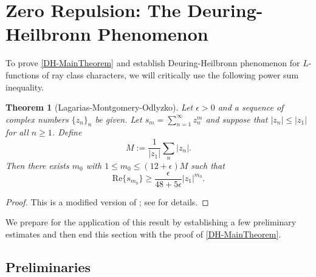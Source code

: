 \documentclass[12pt,psamsfonts]{amsart}
\newtheorem{thm}{Theorem}[section]
\theoremstyle{definition}
\theoremstyle{remark}
\numberwithin{equation}{section}
\theoremstyle{plain}
\theoremstyle{remark}
\renewcommand{\1}{ {\bf 1}}
\renewcommand{\Re}{\mathrm{Re}}
\begin{document}
\section{Zero Repulsion: The Deuring-Heilbronn Phenomenon}
\label{sec:DH_proof}

To prove \cref{DH-MainTheorem} and establish Deuring-Heilbronn phenomenon for $L$-functions of ray class characters, we will critically use the following power sum inequality. 

\begin{thm}[Lagarias-Montgomery-Odlyzko] \label{LMO-PowerSum} Let $\epsilon > 0$ and a sequence of complex numbers $\{z_n\}_n$ be given. Let $s_m = \sum_{n=1}^{\infty} z_n^m$ and suppose that $|z_n| \leq |z_1|$ for all $n \geq 1$. Define
\begin{equation}
M := \frac{1}{|z_1|}\sum_{n} |z_n|. 
\label{PowerSum-M}
\end{equation}
Then there exists $m_0$ with $1 \leq m_0 \leq (12+\epsilon) M$ such that
\[
\Re\{ s_{m_0} \} \geq \frac{\epsilon}{48+5\epsilon} |z_1|^{m_0}. 
\]
\end{thm}
\begin{proof} This is a modified version of \cite[Theorem 4.2]{LMO}; see \cite[Theorem 2.3]{Zaman_2015c} for details. 
\end{proof}
We prepare for the application of this result by establishing a few preliminary estimates and then end this section with the proof of \cref{DH-MainTheorem}.

\subsection{Preliminaries} 
 
\end{document}
